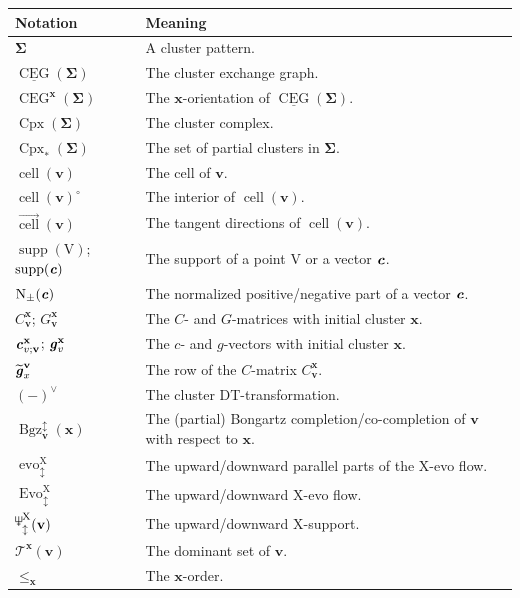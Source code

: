 \documentclass[11pt,reqno]{amsart}
\newcommand{\Neptune}{\mathord{\text{\tikz[baseline=-.5ex,scale=.13]{\draw[line width=.45pt] (0,0)--(0,1.8) (-.6,1.8)--(-.6,.8)--(.6,.8)--(.6,1.8) (-.35,.35)--(.35,.35);}}}}
\theoremstyle{plain}
\theoremstyle{definition}
\numberwithin{equation}{section}
\newcommand\<{\langle}
\renewcommand\>{\rangle}
\newcommand{\CEG}{\operatorname{CEG}} %
\newcommand{\uCEG}{\underline{\CEG}} %
\newcommand{\on}[1]{\operatorname{#1}}
\def\CCx{\on{Cpx}}   %
\def\cc{\on{cell}}  %
\def\dcc{\overrightarrow{\on{cell}}}
\def\vv{\mathbf{v}}
\def\sink{X}
\newcommand{\flowdu}[1]{\on{evo}_{\updownarrow}^{#1}}
\newcommand{\flowDU}[1]{\on{Evo}_{\updownarrow}^{#1}}
\newcommand{\ccpt}[1]{\mathrm{#1}}%
\def\xevo{\ccpt{X}}%
\newcommand{\bfit}[1]{\textbf{\textit{#1}}}
\def\seeds{\mathbf{\Sigma}}
\def\xx{\mathbf{x}}%
\def\cvec{\bfit{c}}
\def\gvec{\bfit{g}}
\def\Cmat{{C}}
\def\Gmat{{G}}
\def\supp{\on{supp}}
\newcommand{\Bgzp}[2]{\operatorname{Bgz}^{\uparrow}_{#2}(#1)}
\newcommand{\Bgzm}[2]{\operatorname{Bgz}^{\downarrow}_{#2}(#1)}
\newcommand{\Bgzpm}[2]{\operatorname{Bgz}^{\updownarrow}_{#2}(#1)}
\newcommand{\suppdu}[1]{\operatorname{\Neptune}_{\updownarrow}^{#1}}
\newcommand{\ol}[1]{\overline{#1}}
\newcommand{\DT}[1]{#1^{\vee}}
\newcommand{\dom}[1]{\mathcal{T}^{#1}}
\def\normal{\on{N}}
\def\tgvec{\widetilde{\gvec}}
\begin{document}
\begingroup
\renewcommand{\arraystretch}{1.15}
\begin{longtable}{@{}p{.32\linewidth}p{.64\linewidth}@{}}
\hline
Notation & Meaning \\
\hline\endhead
$\seeds$& A cluster pattern. \\
$\uCEG(\seeds)$ & The cluster exchange graph. \\
$\CEG^{\xx}(\seeds)$& The $\xx$-orientation of $\uCEG(\seeds)$. \\
$\CCx(\seeds)$ & The cluster complex. \\
$\CCx_*(\seeds)$ & The set of partial clusters in $\seeds$. \\
$\cc(\vv)$ & The cell of $\vv$. \\
$\cc(\vv)^\circ$ & The interior of $\cc(\vv)$. \\
$\dcc(\vv)$ & The tangent directions of $\cc(\vv)$. \\
$\supp(\ccpt{V})$; $\supp(\cvec)$ & The support of a point $\ccpt{V}$ or a vector $\cvec$. \\
$\normal_\pm(\cvec)$& The normalized positive/negative part of a vector $\cvec$. \\
$\Cmat^{\xx}_{\vv}$; $\Gmat^{\xx}_\vv$ & The $C$- and $G$-matrices with initial cluster $\xx$. \\
$\cvec^{\xx}_{v;\vv}$; $\gvec^{\xx}_v$ & The $c$- and $g$-vectors with initial cluster $\xx$. \\
$\tgvec^{\vv}_x$ & The row of the $C$-matrix $\Cmat^{\xx}_\vv$. \\
$\DT{(-)}$ & The cluster DT-transformation. \\
$\Bgzpm{\xx}{\vv}$& The (partial) Bongartz completion/co-completion of $\vv$ with respect to $\xx$. \\
$\flowdu{\xevo}$ & The upward/downward parallel parts of the $\xevo$-evo flow. \\
$\flowDU{\xevo}$ & The upward/downward $\xevo$-evo flow. \\
$\suppdu{\xevo}(\vv)$ & The upward/downward $\xevo$-support.\\
$\dom{\xx}(\vv)$ & The dominant set of $\vv$. \\
$\le_{\xx}$ & The $\xx$-order.\\
\hline
\end{longtable}
\endgroup
\end{document}
